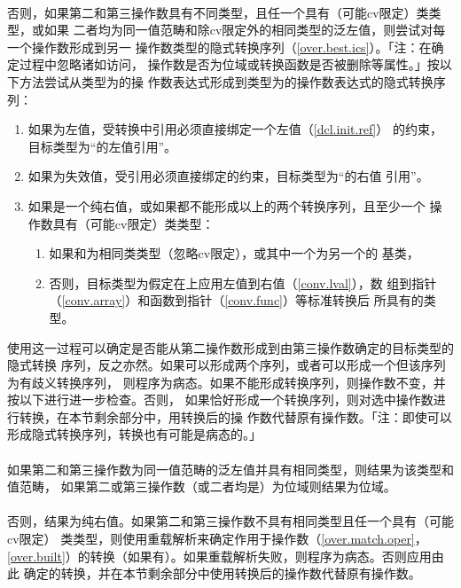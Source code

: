 \paragraph{}
否则，如果第二和第三操作数具有不同类型，且任一个具有（可能cv限定）类类型，或如果
二者均为同一值范畴和除cv限定外的相同类型的泛左值，则尝试对每一个操作数形成到另一
操作数类型的隐式转换序列（\ref{over.best.ics}）。「注：在确定过程中忽略诸如访问，
操作数是否为位域或转换函数是否被删除等属性。」按以下方法尝试从类型为的操
作数表达式形成到类型为的操作数表达式的隐式转换序列：
\begin{enumerate}
  \item{如果为左值，受转换中引用必须直接绑定一个左值（\ref{dcl.init.ref}）
    的约束，目标类型为``的左值引用''。}
  \item{如果为失效值，受引用必须直接绑定的约束，目标类型为``的右值
    引用''。}
  \item{如果是一个纯右值，或如果都不能形成以上的两个转换序列，且至少一个
    操作数具有（可能cv限定）类类型：
    \begin{enumerate}
      \item{如果和为相同类类型（忽略cv限定），或其中一个为另一个的
        基类，}
      \item{否则，目标类型为假定在上应用左值到右值（\ref{conv.lval}），数
        组到指针（\ref{conv.array}）和函数到指针（\ref{conv.func}）等标准转换后
        所具有的类型。}
    \end{enumerate}
  }
\end{enumerate}
使用这一过程可以确定是否能从第二操作数形成到由第三操作数确定的目标类型的隐式转换
序列，反之亦然。如果可以形成两个序列，或者可以形成一个但该序列为有歧义转换序列，
则程序为病态。如果不能形成转换序列，则操作数不变，并按以下进行进一步检查。否则，
如果恰好形成一个转换序列，则对选中操作数进行转换，在本节剩余部分中，用转换后的操
作数代替原有操作数。「注：即使可以形成隐式转换序列，转换也有可能是病态的。」

\paragraph{}
如果第二和第三操作数为同一值范畴的泛左值并具有相同类型，则结果为该类型和值范畴，
如果第二或第三操作数（或二者均是）为位域则结果为位域。

\paragraph{}
否则，结果为纯右值。如果第二和第三操作数不具有相同类型且任一个具有（可能cv限定）
类类型，则使用重载解析来确定作用于操作数（\ref{over.match.oper}，
\ref{over.built}）的转换（如果有）。如果重载解析失败，则程序为病态。否则应用由此
确定的转换，并在本节剩余部分中使用转换后的操作数代替原有操作数。

